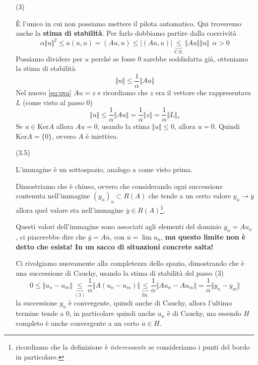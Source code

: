 \documentclass[10pt,a4paper,twoside,openright]{book}
\begin{document}
\begin{dimostrazione}
\begin{itemize}
        \item[(3)]

              È l'unico in cui non possiamo mettere il pilota automatico. Qui troveremo anche la \textbf{stima di stabilità}. Per farlo dobbiamo partire dalla coercività
              \begin{equation*}
                  \alpha \Vert u\Vert ^{2} \leqslant a(u,u) =(Au,u) \leqslant | (Au,u)| \underbrace{\leqslant }_{\text{C.S.}}\Vert Au\Vert \Vert u\Vert \ \ \alpha  >0
              \end{equation*}
              Possiamo dividere per $u$ perché se fosse $0$ sarebbe soddisfatta già, otteniamo la stima di stabilità
              \begin{equation*}
                  \Vert u\Vert \leqslant \frac{1}{\alpha }\Vert Au\Vert
              \end{equation*}
              Nel nuovo \eqref{eq:pva} $Au=z$ e ricordiamo che $z$ era il vettore che rappresentava $L$ (come visto al passo 0)
              \begin{equation*}
                  \Vert u\Vert \leqslant \frac{1}{\alpha }\Vert Au\Vert =\frac{1}{\alpha }\Vert z\Vert =\frac{1}{\alpha }\Vert L\Vert _{*}
              \end{equation*}
              Se $u\in \mathrm{Ker} A$ allora $Au=0$, usando la stima $\Vert u\Vert \leqslant 0$, allora $u=0$. Quindi $\mathrm{Ker} A=\{0\}$, ovvero $A$ è iniettivo.

        \item[(3.5)]

              L'immagine è un sottospazio, analogo a come visto prima.

              Dimostriamo che è chiuso, ovvero che considerando ogni successione contenuta nell'immagine $(y_{n})_{n} \subset R(A)$ che tende a un certo valore $y_{n}\rightarrow \overline{y}$ allora quel valore sta nell'immagine $\overline{y} \in R(A)$\footnote{ricordiamo che la definizione è \textit{interessante} se consideriamo i punti del bordo in particolare.}.

              Questi valori dell'immagine sono associati agli elementi del dominio $y_{n} =Au_{n}$, ci piacerebbe dire che $\overline{y} =A\overline{u}$, con $\overline{u} =\lim u_{n}$, \textbf{ma questo limite non è detto che esista! In un sacco di situazioni concrete salta!}

              Ci rivolgiamo nuovamente alla completezza dello spazio, dimostrando che è una successione di Cauchy, usando la stima di stabilità del passo (3)
              \begin{equation*}
                  0\leqslant \Vert u_{n} -u_{m}\Vert \underbrace{\leqslant }_{(3)}\frac{1}{\alpha }\Vert A(u_{n} -u_{m})\Vert \underbrace{\leqslant }_{\text{lin.}}\frac{1}{\alpha }\Vert Au_{n} -Au_{m}\Vert =\frac{1}{\alpha }\Vert y_{n} -y_{m}\Vert
              \end{equation*}
              la successione $y_{n}$ è convergente, quindi anche di Cauchy, allora l'ultimo termine tende a $0$, in particolare quindi anche $u_{n}$ è di Cauchy, ma essendo $H$ completo è anche convergente a un certo $\overline{u} \in H$.


\end{itemize}
\end{dimostrazione}
\end{document}
